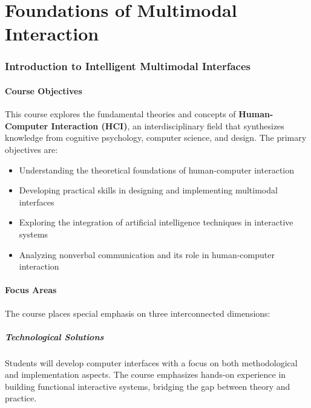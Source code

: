 \documentclass[11pt,a4paper]{article}
\theoremstyle{definition}
\theoremstyle{plain}
\theoremstyle{remark}
\begin{document}
\newpage
\tableofcontents
\newpage

\part{Foundations of Multimodal Interaction}

\section{Introduction to Intelligent Multimodal Interfaces}

\subsection{Course Objectives}

This course explores the fundamental theories and concepts of \textbf{Human-Computer Interaction (HCI)}, an interdisciplinary field that synthesizes knowledge from cognitive psychology, computer science, and design. The primary objectives are:

\begin{itemize}
    \item Understanding the theoretical foundations of human-computer interaction
    \item Developing practical skills in designing and implementing multimodal interfaces
    \item Exploring the integration of artificial intelligence techniques in interactive systems
    \item Analyzing nonverbal communication and its role in human-computer interaction
\end{itemize}

\subsection{Focus Areas}

The course places special emphasis on three interconnected dimensions:

\subsubsection{Technological Solutions}

Students will develop computer interfaces with a focus on both methodological and implementation aspects. The course emphasizes hands-on experience in building functional interactive systems, bridging the gap between theory and practice.
\end{document}
